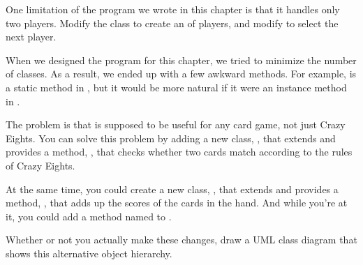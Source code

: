 \begin{exercise}  %

One limitation of the program we wrote in this chapter is that it handles only two players.
Modify the  class to create an  of players, and modify  to select the next player.

\end{exercise}


\begin{exercise}  %

When we designed the program for this chapter, we tried to minimize the number of classes.
As a result, we ended up with a few awkward methods.
For example,  is a static method in , but it would be more natural if it were an instance method in .

The problem is that  is supposed to be useful for any card game, not just Crazy Eights.
You can solve this problem by adding a new class, , that extends  and provides a method, , that checks whether two cards match according to the rules of Crazy Eights.

At the same time, you could create a new class, , that extends  and provides a method, , that adds up the scores of the cards in the hand.
And while you're at it, you could add a method named  to .

Whether or not you actually make these changes, draw a UML class diagram that shows this alternative object hierarchy.

\end{exercise}
